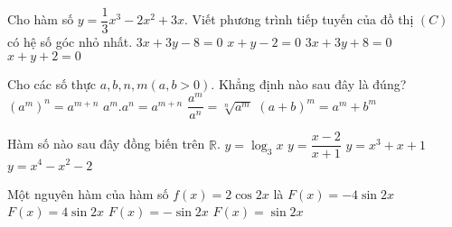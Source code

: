 \begin{ex}%
	Cho hàm số $y=\dfrac{1}{3}x^3-2x^2+3x$. Viết phương trình tiếp tuyến của đồ thị $(C)$ có hệ số góc nhỏ nhất.
	\choice
	{\True $3x+3y-8=0$}
	{$x+y-2=0$}
	{$3x+3y+8=0$}
	{$x+y+2=0$}
\end{ex}
\begin{ex}%
	Cho các số thực $a,b,n,m\left(a,b>0\right)$. Khẳng định nào sau đây là đúng?
	\choice
	{$(a^m)^n={a}^{m+n}$}
	{\True $a^m.a^n={a}^{m+n}$}
	{$\dfrac{a^m}{a^n}=\sqrt[n]{a^m}$}
	{$(a+b)^m=a^m+b^m$}
\end{ex}
\begin{ex}%
	Hàm số nào sau đây đồng biến trên $\mathbb{R}$.
	\choice
	{$y=\log_3x$}
	{$y=\dfrac{x-2}{x+1}$}
	{\True $y=x^3+x+1$}
	{$y=x^4-x^2-2$}
\end{ex}
\begin{ex}%
	Một nguyên hàm của hàm số $f(x)=2\cos 2x$ là
	\choice
	{$F(x)=-4\sin 2x$}
	{$F(x)=4\sin 2x$}
	{$F(x)=-\sin 2x$}
	{\True $F(x)=\sin 2x$}
\end{ex}
